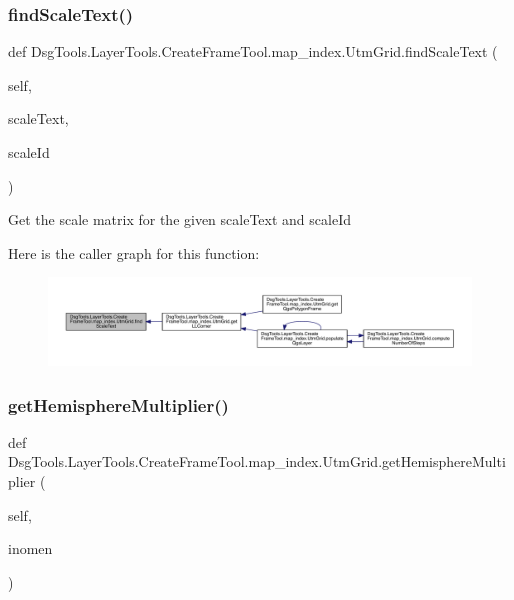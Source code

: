 \subsubsection{\texorpdfstring{find\+Scale\+Text()}{findScaleText()}}
{\footnotesize\ttfamily def Dsg\+Tools.\+Layer\+Tools.\+Create\+Frame\+Tool.\+map\+\_\+index.\+Utm\+Grid.\+find\+Scale\+Text (\begin{DoxyParamCaption}\item[{}]{self,  }\item[{}]{scale\+Text,  }\item[{}]{scale\+Id }\end{DoxyParamCaption})}

\begin{DoxyVerb}Get the scale matrix for the given scaleText and scaleId
\end{DoxyVerb}
 Here is the caller graph for this function\+:
\nopagebreak
\begin{figure}[H]
\begin{center}
\leavevmode
\includegraphics[width=350pt]{class_dsg_tools_1_1_layer_tools_1_1_create_frame_tool_1_1map__index_1_1_utm_grid_ab732f5b04d64f32b3b67eec2ed0217cc_icgraph}
\end{center}
\end{figure}
\mbox{\label{class_dsg_tools_1_1_layer_tools_1_1_create_frame_tool_1_1map__index_1_1_utm_grid_ae505e6ba649d2dff7573438196cd8f5e}} 
\subsubsection{\texorpdfstring{get\+Hemisphere\+Multiplier()}{getHemisphereMultiplier()}}
{\footnotesize\ttfamily def Dsg\+Tools.\+Layer\+Tools.\+Create\+Frame\+Tool.\+map\+\_\+index.\+Utm\+Grid.\+get\+Hemisphere\+Multiplier (\begin{DoxyParamCaption}\item[{}]{self,  }\item[{}]{inomen }\end{DoxyParamCaption})}

